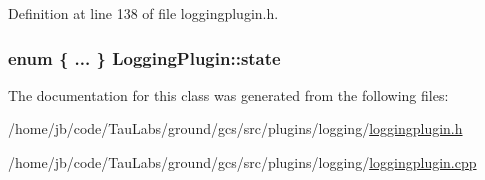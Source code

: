 \-Definition at line 138 of file loggingplugin.\-h.

\hypertarget{class_logging_plugin_ae4e8e9ffae93981361d7569667082cf3}{
\subsubsection[{state}]{\setlength{\rightskip}{0pt plus 5cm}enum \{ ... \}   {\bf \-Logging\-Plugin\-::state}}}\label{class_logging_plugin_ae4e8e9ffae93981361d7569667082cf3}


\-The documentation for this class was generated from the following files\-:\begin{DoxyCompactItemize}
\item 
/home/jb/code/\-Tau\-Labs/ground/gcs/src/plugins/logging/\hyperlink{loggingplugin_8h}{loggingplugin.\-h}\item 
/home/jb/code/\-Tau\-Labs/ground/gcs/src/plugins/logging/\hyperlink{loggingplugin_8cpp}{loggingplugin.\-cpp}\end{DoxyCompactItemize}
